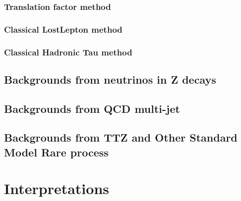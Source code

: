 \clearpage
\subsubsection{Translation factor method}
%

\clearpage
\subsubsection{Classical LostLepton method}
\label{sec:c4bgll}


\clearpage
\subsubsection{Classical Hadronic Tau method}
%

\clearpage
\subsection{Backgrounds from neutrinos in Z decays}
%

\clearpage
\subsection{Backgrounds from QCD multi-jet}
\label{sec:c4bgqcd}


\clearpage
\subsection{Backgrounds from TTZ and Other Standard Model Rare process}
\label{sec:c4bgttzrare}


\clearpage
\section{Interpretations}
